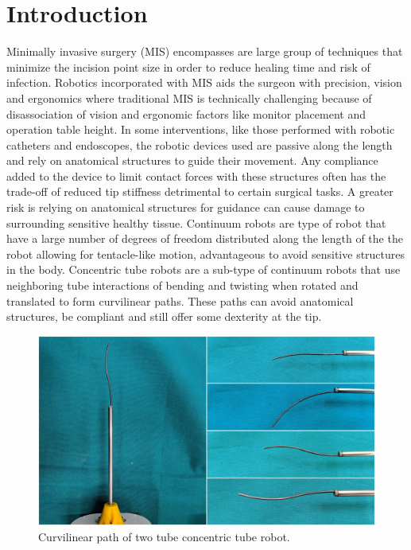\section{Introduction}
\label{intro}
Minimally invasive surgery (MIS) encompasses are large group of techniques that minimize the incision point size in order to reduce healing time and risk of infection. Robotics incorporated with MIS aids the surgeon with precision, vision and ergonomics where traditional MIS is technically challenging because of disassociation of vision and ergonomic factors like monitor placement and operation table height. In some interventions, like those performed with robotic catheters and endoscopes, the robotic devices used are passive along the length and rely on anatomical structures to guide their movement. Any compliance added to the device to limit contact forces with these structures often has the trade-off of reduced tip stiffness detrimental to certain surgical tasks. A greater risk is relying on anatomical structures for guidance can cause damage to surrounding sensitive healthy tissue. Continuum robots are type of robot that have a large number of degrees of freedom distributed along the length of the the robot allowing for tentacle-like motion, advantageous to avoid sensitive structures in the body. Concentric tube robots are a sub-type of continuum robots that use neighboring tube interactions of bending and twisting when rotated and translated to form curvilinear paths. These paths can avoid anatomical structures, be compliant and still offer some dexterity at the tip.
\begin{figure}
  \includegraphics[scale=0.15]{images/ctr-collage.jpg}
\caption{Curvilinear path of two tube concentric tube robot.}
\label{fig:1}
\end{figure}
